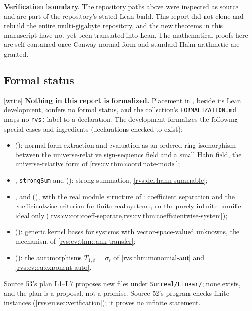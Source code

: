 \documentclass[11pt,letterpaper]{article}
\numberwithin{equation}{section}
\theoremstyle{definition}
\theoremstyle{remark}
\newcommand{\wtag}{\textup{[write]}}%
\begin{document}
\begin{auditbox}
\textbf{Verification boundary.}
The repository paths above were inspected as source and are part of the repository's
stated Lean build. This report did not clone and rebuild the entire multi-gigabyte
repository, and the new theorems in this manuscript have not yet been translated
into Lean. The mathematical proofs here are self-contained once Conway normal form
and standard Hahn arithmetic are granted.
\end{auditbox}

\subsection{Formal status}\label{rvs:w:sec:formal}

\wtag{} \textbf{Nothing in this report is formalized.}  Placement in
, beside its Lean development, confers no
formal status, and the collection's \texttt{FORMALIZATION.md} maps no
\texttt{rvs:} label to a declaration.  The development formalizes the
following special cases and ingredients (declarations checked to exist):
\begin{itemize}
\item {}
(): normal-form
extraction and evaluation as an ordered ring isomorphism between the
universe-relative sign-sequence field and a small Hahn field, the
universe-relative form of \cref{rvs:cv:thm:coordinate-model};
\item {},
\texttt{strongSum} and 
(): strong
summation, \cref{rvs:def:hahn-summable};
\item {},
 and
(), with the
real module structure of
: coefficient
separation and the coefficientwise criterion for finite real systems, on the
purely infinite omnific ideal only
(\cref{rvs:cv:cor:coeff-separate,rvs:cv:thm:coefficientwise-system});
\item {} ():
generic kernel bases for systems with vector-space-valued unknowns, the
mechanism of \cref{rvs:cv:thm:rank-transfer};
\item {}
(): the
automorphisms \(T_{1,\phi}=\sigma_e\) of \cref{rvs:thm:monomial-aut} and
\eqref{rvs:cv:eq:exponent-auto}.
\end{itemize}
Source 53's plan L1--L7 proposes new files under \texttt{Surreal/Linear/};
none exists, and the plan is a proposal, not a promise.  Source 52's program
checks finite instances (\cref{rvs:eu:sec:verification}); it proves no infinite
statement.
\end{document}

